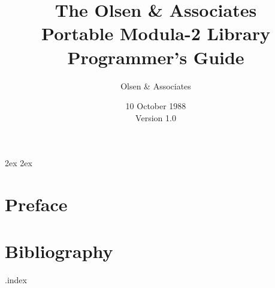 
\makeindex			

\title{The Olsen \& Associates \\
	Portable Modula-2 Library \\
	Programmer's Guide} 
\author{Olsen \& Associates}

\date{10 October 1988\\
	Version 1.0}


\parindent 0pt
\parskip 2ex
\parsep 2ex

\maketitle

\tableofcontents
\newpage

\chapter*{Preface}
\pagestyle{myheadings}














\appendix







\chapter*{Bibliography}
\pagestyle{myheadings}


\begin{theindex}
\jobname.index
\end{theindex}


